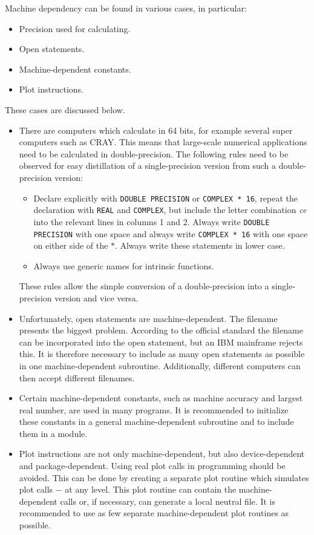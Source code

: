 \documentclass[12pt]{book}
\begin{document}
Machine dependency can be found in various cases, in particular:
\begin{itemize}
  \item Precision used for calculating.
  \item Open statements.
  \item Machine-dependent constants.
  \item Plot instructions.
\end{itemize}
These cases are discussed below.
\begin{itemize}
  \item There are computers which calculate in 64 bits, for example several super computers such as CRAY.
        This means that large-scale numerical applications need to be calculated in double-precision. The
        following rules need to be observed for easy distillation of a single-precision version from such
        a double-precision version:
        \begin{itemize}
          \item Declare explicitly with {\tt DOUBLE PRECISION} or {\tt COMPLEX * 16}, repeat the declaration with {\tt REAL}
                and {\tt COMPLEX}, but include the letter combination \textit{ce} into the relevant lines in columns 1 and 2. Always
                write {\tt DOUBLE PRECISION} with one space and always write {\tt COMPLEX * 16} with one space on either side
                of the $*$. Always write these statements in lower case.
          \item Always use generic names for intrinsic functions.
        \end{itemize}
        These rules allow the simple conversion of a double-precision into a single-precision version and vice versa.
  \item Unfortunately, open statements are machine-dependent. The filename presents the biggest problem.
        According to the official standard the filename can be incorporated into the open statement, but an
        IBM mainframe rejects this. It is therefore necessary to include as many open statements as possible
        in one machine-dependent subroutine. Additionally, different computers can then accept different
        filenames.
  \item Certain machine-dependent constants, such as machine accuracy and largest real number,
        are used in many programs. It is recommended to initialize these constants in a general
        machine-dependent subroutine and to include them in a module.
  \item Plot instructions are not only machine-dependent, but also device-dependent and package-dependent.
        Using real plot calls in programming should be avoided. This can be done by creating a separate
        plot routine which simulates plot calls $-$ at any level. This plot routine can contain the
        machine-dependent calls or, if necessary, can generate a local neutral file. It is recommended
        to use as few separate machine-dependent plot routines as possible.
\end{itemize}
\end{document}
